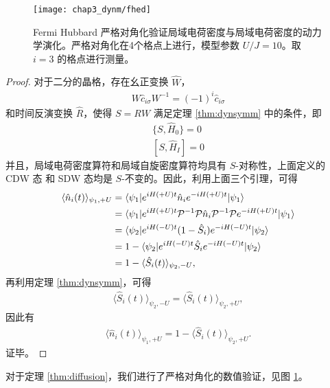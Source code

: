 \begin{figure}[!htb]
\centering
\texttt{[image: chap3\_dynm/fhed]}
\caption{Fermi Hubbard 严格对角化验证局域电荷密度与局域电荷密度的动力学演化。严格对角化在4个格点上进行，模型参数 $U/J=10$。取 $i=3$ 的格点进行测量。}
\label{fig:diffusion:fhed}
\end{figure}

\begin{proof}
对于二分的晶格，存在幺正变换 $\hat{W}$，
\begin{align}
W\hat{c}_{i\sigma}W^{-1} = (-1)^i\hat{c}_{i\sigma}
\end{align}
和时间反演变换 $\hat{R}$，使得 $S=RW$ 满足定理 \ref{thm:dynsymm} 中的条件，即
\begin{align}
\{S, \hat{H}_0\} = 0\\
[S, \hat{H}_I]=0
\end{align}
并且，局域电荷密度算符和局域自旋密度算符均具有 $S$-对称性，上面定义的 CDW 态 和 SDW 态均是 $S$-不变的。因此，利用上面三个引理，可得
\begin{align}
\langle \hat{n}_i(t)\rangle_{\psi_1, +U} 
&= \langle \psi_1|e^{iH(+U)t}\hat{n}_ie^{-iH(+U)t}|\psi_1\rangle \notag\\
&= \langle \psi_1|e^{iH(+U)t}\mathcal{P}^{-1}\mathcal{P}\hat{n}_i\mathcal{P}^{-1}\mathcal{P}e^{-iH(+U)t}|\psi_1\rangle \notag\\
&= \langle \psi_2|e^{iH(-U)t} (1-\hat{S}_i) e^{-iH(-U)t}|\psi_2\rangle \\
&= 1 - \langle \psi_2|e^{iH(-U)t} \hat{S}_i e^{-iH(-U)t}|\psi_2\rangle \notag\\
&= 1 - \langle \hat{S}_i(t) \rangle_{\psi_2, -U}, \notag 
\end{align}
再利用定理 \ref{thm:dynsymm}，可得
\begin{align}
\langle \hat{S}_i(t)\rangle_{\psi_2, -U} = \langle \hat{S}_i(t)\rangle_{\psi_2, +U},  
\end{align}
因此有
\begin{align}\label{eq:n=1-S}
\langle \hat{n}_i(t)\rangle_{\psi_1, +U} = 1 - \langle \hat{S}_i(t)\rangle_{\psi_2, +U}. 
\end{align}
证毕。
\end{proof}

对于定理 \ref{thm:diffusion}，我们进行了严格对角化的数值验证，见图 \ref{fig:diffusion:fhed}。



